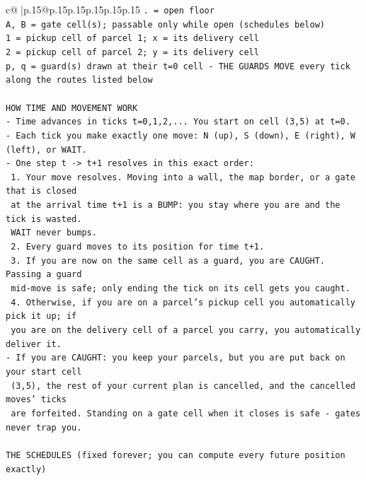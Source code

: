 \documentclass{article}
\begin{document}
{\begin{supertabular}{c@{$\;$}|p{.15\linewidth}@{}p{.15\linewidth}p{.15\linewidth}p{.15\linewidth}p{.15\linewidth}p{.15\linewidth}}
{{{\texttt{. = open floor} \\
\texttt{A, B = gate cell(s); passable only while open (schedules below)} \\
\texttt{1 = pickup cell of parcel 1; x = its delivery cell} \\
\texttt{2 = pickup cell of parcel 2; y = its delivery cell} \\
\texttt{p, q = guard(s) drawn at their t=0 cell {-} THE GUARDS MOVE every tick along the routes listed below} \\
\\ 
\texttt{HOW TIME AND MOVEMENT WORK} \\
\texttt{{-} Time advances in ticks t=0,1,2,... You start on cell (3,5) at t=0.} \\
\texttt{{-} Each tick you make exactly one move: N (up), S (down), E (right), W (left), or WAIT.} \\
\texttt{{-} One step t {-}> t+1 resolves in this exact order:} \\
\texttt{  1. Your move resolves. Moving into a wall, the map border, or a gate that is closed} \\
\texttt{     at the arrival time t+1 is a BUMP: you stay where you are and the tick is wasted.} \\
\texttt{     WAIT never bumps.} \\
\texttt{  2. Every guard moves to its position for time t+1.} \\
\texttt{  3. If you are now on the same cell as a guard, you are CAUGHT. Passing a guard} \\
\texttt{     mid{-}move is safe; only ending the tick on its cell gets you caught.} \\
\texttt{  4. Otherwise, if you are on a parcel's pickup cell you automatically pick it up; if} \\
\texttt{     you are on the delivery cell of a parcel you carry, you automatically deliver it.} \\
\texttt{{-} If you are CAUGHT: you keep your parcels, but you are put back on your start cell} \\
\texttt{  (3,5), the rest of your current plan is cancelled, and the cancelled moves' ticks} \\
\texttt{  are forfeited. Standing on a gate cell when it closes is safe {-} gates never trap you.} \\
\\ 
\texttt{THE SCHEDULES (fixed forever; you can compute every future position exactly)} \\
}}}
\end{supertabular}}
\end{document}
